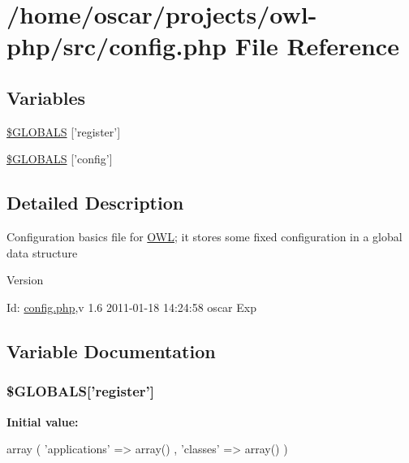 \section{/home/oscar/projects/owl-\/php/src/config.php File Reference}
\label{config_8php}
\subsection*{Variables}
\begin{DoxyCompactItemize}
\item 
\hyperlink{config_8php_a6cc1ef3a8c20d69988531d27f931855b}{\$GLOBALS} \mbox{[}'register'\mbox{]}
\item 
\hyperlink{config_8php_ab954a2cc6c5b7053b6cabb0c8dea38d1}{\$GLOBALS} \mbox{[}'config'\mbox{]}
\end{DoxyCompactItemize}


\subsection{Detailed Description}
Configuration basics file for \hyperlink{classOWL}{OWL}; it stores some fixed configuration in a global data structure \begin{DoxyVersion}{Version}

\end{DoxyVersion}
\begin{DoxyParagraph}{Id:}
\hyperlink{config_8php}{config.php},v 1.6 2011-\/01-\/18 14:24:58 oscar Exp 
\end{DoxyParagraph}


\subsection{Variable Documentation}
\subsubsection[{\$GLOBALS}]{\setlength{\rightskip}{0pt plus 5cm}\$GLOBALS\mbox{[}'register'\mbox{]}}\label{config_8php_a6cc1ef3a8c20d69988531d27f931855b}
{\bfseries Initial value:}
\begin{DoxyCode}
 array (
          'applications'        => array()
        , 'classes'                     => array()
)
\end{DoxyCode}


